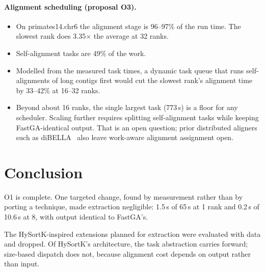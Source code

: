 \documentclass[sigconf,nonacm]{acmart}
\begin{document}
\paragraph{Alignment scheduling (proposal O3).}
\begin{itemize}
\item On primates14.chr6 the alignment stage is 96--97\% of the run time.
The slowest rank does 3.35$\times$ the average at 32 ranks.
\item Self-alignment tasks are 49\% of the work.
\item Modelled from the measured task times, a dynamic task queue that runs
self-alignments of long contigs first would cut the slowest rank's alignment
time by 33--42\% at 16--32 ranks.
\item Beyond about 16 ranks, the single largest task (773\,s) is a floor for
any scheduler. Scaling further requires splitting self-alignment tasks while
keeping FastGA-identical output. That is an open question; prior distributed
aligners such as diBELLA~\cite{dibella} also leave work-aware alignment
assignment open.
\end{itemize}

\section{Conclusion}

O1 is complete. One targeted change, found by measurement rather than by
porting a technique, made extraction negligible: 1.5\,s of 65\,s at 1 rank and
0.2\,s of 10.6\,s at 8, with output identical to FastGA's.

The HySortK-inspired extensions planned for extraction were evaluated with
data and dropped. Of HySortK's architecture, the task abstraction carries
forward; size-based dispatch does not, because alignment cost depends on
output rather than input.



\end{document}
